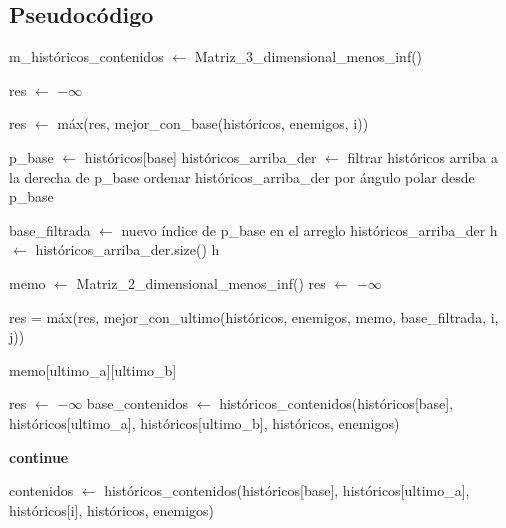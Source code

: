 \subsection{Pseudocódigo}
\begin{algorithmic}
	\State m_históricos_contenidos $\gets$ Matriz_3_dimensional_menos_inf() 

	\State res $\gets$ $-\infty$

		\State res $\gets$ máx(res, mejor_con_base(históricos, enemigos, i))
	\EndFor

\EndFunction

\vspace{2em}
	\State p_base $\gets$ históricos[base]
	\State históricos_arriba_der $\gets$ filtrar históricos arriba a la derecha de p_base
	\State ordenar históricos_arriba_der por ángulo polar desde p_base

	\State base_filtrada $\gets$ nuevo índice de p_base en el arreglo históricos_arriba_der
	\State h $\gets$ históricos_arriba_der.size()
		\State \Return h
	\EndIf

	\State memo $\gets$ Matriz_2_dimensional_menos_inf() 
	\State res $\gets$ $-\infty$

			 
				\State res = máx(res, mejor_con_ultimo(históricos, enemigos, memo, base_filtrada, i, j))
			\EndIf
		\EndFor
	\EndFor
\EndFunction
\vspace{2em}

		\State \Return memo[ultimo_a][ultimo_b]
	\EndIf

	\State res $\gets$ $-\infty$
	\State {} 
	\State base_contenidos $\gets$ históricos_contenidos(históricos[base], históricos[ultimo_a], históricos[ultimo_b], históricos, enemigos) 

				\State \textbf{continue}
			\EndIf

			\State contenidos $\gets$ históricos_contenidos(históricos[base], históricos[ultimo_a], históricos[i], históricos, enemigos)


\end{algorithmic}
